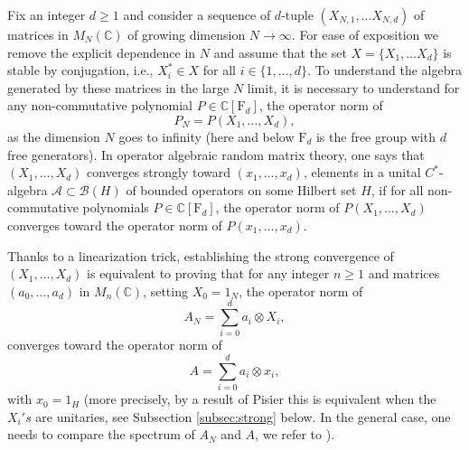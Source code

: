 \documentclass[11pt]{article}
\newcommand{\cA}{\mathcal{A}}
\newcommand{\dF}{\mathrm{F}}
\newcommand{\dC}{\mathbb {C}}
\newcommand{\cB}{\mathcal{B}}
\newcommand{\1}{1\!\!{\sf I}}
\begin{document}
Fix an integer $d \geq 1$ and consider a sequence of $d$-tuple $(X_{N,1},\ldots X_{N,d})$ of matrices in $M_N(\dC)$ of growing dimension $N \to \infty$. For ease of exposition we remove the explicit dependence in $N$ and assume that the set $X = \{X_1,\ldots X_d\}$ is stable by conjugation, i.e., $X_i^* \in X$ for all $i \in \{1,\ldots,d\}$. To understand the algebra generated by these matrices 
in the large $N$ limit, it is necessary
to understand for any non-commutative polynomial $P \in \dC[\dF_d]$, the operator norm  of 
\begin{equation}\label{eq:PNintro}
P_N = P(X_1,\ldots,X_d),
\end{equation}
as the dimension $N$ goes to infinity (here and below $\dF_d$ is the free group with $d$ free generators). 
In operator algebraic random matrix theory, one says that $(X_1,\ldots,X_d)$ converges strongly toward $(x_1,\ldots,x_d)$, elements in a unital $C^*$-algebra $\cA \subset \cB(H)$ of bounded operators on some Hilbert set $H$, if for all non-commutative polynomials $P \in \dC[\dF_d]$, the operator norm of   $P(X_1,\ldots,X_d)$ converges toward the operator norm of $P(x_1,\ldots,x_d)$.


Thanks to a linearization trick, establishing the strong convergence of $(X_1,\ldots,X_d)$  is
equivalent to proving that for any integer $n \geq 1$ and matrices $(a_0,\ldots,a_d)$ in $M_n(\dC)$, setting $X_0 = 1_N$, the operator norm of 
\begin{equation}\label{eq:ANintro}
A_N =  \sum_{i=0}^d a_i \otimes X_i,
\end{equation}
converges toward the operator norm of 
\begin{equation*}
A  =  \sum_{i=0}^d a_i \otimes x_i,
\end{equation*}
with $x_0 = 1_H$ (more precisely, by a result of Pisier \cite{MR1401692} this is equivalent when the $X_i's$ are unitaries, see Subsection \ref{subsec:strong} below. In the general case, one needs to compare the spectrum of $A_N$ and $A$, we refer to \cite{MR3585560}). 
\end{document}
